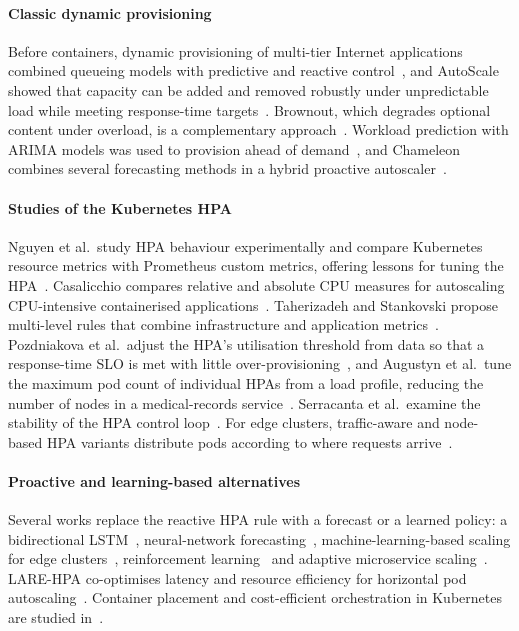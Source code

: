\documentclass[conference,a4paper]{IEEEtran}
\begin{document}
\paragraph{Classic dynamic provisioning}
Before containers, dynamic provisioning of multi-tier Internet applications
combined queueing models with predictive and reactive
control~\cite{urgaonkar2008agile}, and AutoScale showed that capacity can be
added and removed robustly under unpredictable load while meeting
response-time targets~\cite{gandhi2012autoscale}. Brownout, which degrades
optional content under overload, is a complementary
approach~\cite{xu2020brownout}. Workload prediction with ARIMA models was used
to provision ahead of demand~\cite{calheiros2015workload}, and Chameleon
combines several forecasting methods in a hybrid proactive
autoscaler~\cite{bauer2019chameleon}.

\paragraph{Studies of the Kubernetes HPA}
Nguyen et al.\ study HPA behaviour experimentally and compare Kubernetes
resource metrics with Prometheus custom metrics, offering lessons for tuning
the HPA~\cite{nguyen2020horizontal}. Casalicchio compares relative and absolute
CPU measures for autoscaling CPU-intensive containerised
applications~\cite{casalicchio2019a}. Taherizadeh and Stankovski propose
multi-level rules that combine infrastructure and application
metrics~\cite{taherizadeh2019dynamic}. Pozdniakova et al.\ adjust the HPA's
utilisation threshold from data so that a response-time SLO is met with little
over-provisioning~\cite{pozdniakova2024slaadaptive}, and Augustyn et al.\ tune
the maximum pod count of individual HPAs from a load profile, reducing the
number of nodes in a medical-records service~\cite{augustyn2024tuning}.
Serracanta et al.\ examine the stability of the HPA control
loop~\cite{serracanta2025on}. For edge clusters, traffic-aware and node-based
HPA variants distribute pods according to where requests
arrive~\cite{phuc2022trafficaware,phuc2022nodebased}.

\paragraph{Proactive and learning-based alternatives}
Several works replace the reactive HPA rule with a forecast or a learned
policy: a bidirectional LSTM~\cite{dangquang2021deep}, neural-network
forecasting~\cite{imdoukh2020machine}, machine-learning-based scaling for edge
clusters~\cite{toka2021machine,toka2020adaptive}, reinforcement
learning~\cite{abdelkhaleq2023intelligent} and adaptive microservice
scaling~\cite{cruzcoulson2020adaptive}. LARE-HPA co-optimises latency and
resource efficiency for horizontal pod autoscaling~\cite{kim2025larehpa}.
Container placement and cost-efficient orchestration in Kubernetes are studied
in~\cite{rossi2020geodistributed,zhong2020a}.
\end{document}
